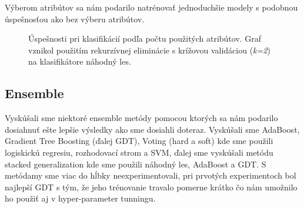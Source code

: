 \documentclass[runningheads]{llncs}
\begin{document}
Výberom atribútov sa nám podarilo natrénovať jednoduchšie modely s podobnou úspešnosťou ako bez výberu atribútov.

\begin{figure}%
    \centering
    \qquad
    \caption{Úspešnosti pri klasifikácií podľa počtu použitých atribútov. Graf vznikol použitím rekurzívnej eliminácie s krížovou validáciou (\textit{k=2}) na klasifikátore náhodný les.}%
    \label{fig:feature_selection_classification_position}%
\end{figure}

\subsection{Ensemble}

Vyskúšali sme niektoré ensemble metódy pomocou ktorých sa nám podarilo dosiahnuť ešte lepšie výsledky ako sme dosiahli doteraz. Vyskúšali sme AdaBoost, Gradient Tree Boosting (ďalej GDT), Voting (hard a soft) kde sme použili logiskickú regresiu, rozhodovací strom a SVM, ďalej sme vyskúšali metódu stacked generalization kde sme použili náhodný les, AdaBoost a GDT. S metódamy sme viac do hĺbky neexperimentovali, pri prvotých experimentoch bol najlepší GDT s tým, že jeho trénovanie travalo pomerne krátko čo nám umožnilo ho použiť aj v hyper-parameter tunningu.
\end{document}
